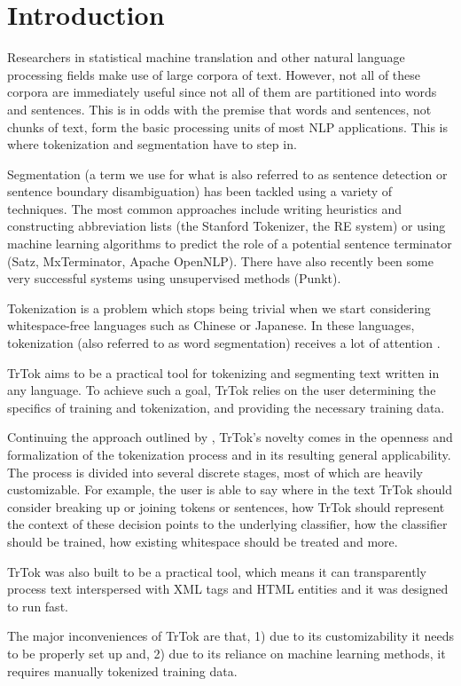 \section{Introduction}
\label{sec:introduction}

Researchers in statistical machine translation and other natural
language processing fields make use of large corpora of text. However,
not all of these corpora are immediately useful since not all of them
are partitioned into words and sentences. This is in odds with the
premise that words and sentences, not chunks of text, form the basic
processing units of most NLP applications. This is where tokenization
and segmentation have to step in.

Segmentation (a term we use for what is also referred to as sentence
detection or sentence boundary disambiguation) has been tackled using
a variety of techniques. The most common approaches include writing
heuristics and constructing abbreviation lists (the Stanford
Tokenizer, the RE system) or using machine learning algorithms to
predict the role of a potential sentence terminator (Satz,
MxTerminator, Apache OpenNLP). There have also recently been some very
successful systems using unsupervised methods (Punkt).

Tokenization is a problem which stops being trivial when we start
considering whitespace-free languages such as Chinese or Japanese. In
these languages, tokenization (also referred to as word segmentation)
receives a lot of attention \cite{seg-bakeoff}.

TrTok aims to be a practical tool for tokenizing and segmenting text
written in any language. To achieve such a goal, TrTok relies on the
user determining the specifics of training and tokenization, and
providing the necessary training data.

Continuing the approach outlined by \citet{sbd-trtok-orig}, TrTok's
novelty comes in the openness and formalization of the tokenization
process and in its resulting general applicability. The process is
divided into several discrete stages, most of which are heavily
customizable. For example, the user is able to say where in the text
TrTok should consider breaking up or joining tokens or sentences, how
TrTok should represent the context of these decision points to the
underlying classifier, how the classifier should be trained, how
existing whitespace should be treated and more.

TrTok was also built to be a practical tool, which means it can
transparently process text interspersed with XML tags and HTML
entities and it was designed to run fast.

The major inconveniences of TrTok are that, 1) due to its
customizability it needs to be properly set up and, 2) due to its
reliance on machine learning methods, it requires manually tokenized
training data.

